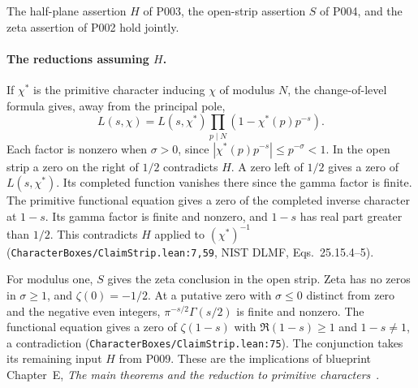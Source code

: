 
\begin{formalstatement}\label{pn:P006}
The half-plane assertion $H$ of P003, the open-strip assertion $S$ of P004, and the zeta assertion of P002 hold jointly.
\end{formalstatement}
\paragraph{The reductions assuming $H$.} If $\chi^*$ is the primitive character inducing $\chi$ of modulus $N$, the change-of-level formula gives, away from the principal pole,
\[
 L(s,\chi)=L(s,\chi^*)\prod_{p\mid N}(1-\chi^*(p)p^{-s}).
\]
Each factor is nonzero when $\sigma>0$, since $|\chi^*(p)p^{-s}|\le p^{-\sigma}<1$. In the open strip a zero on the right of $1/2$ contradicts $H$. A zero left of $1/2$ gives a zero of $L(s,\chi^*)$. Its completed function vanishes there since the gamma factor is finite. The primitive functional equation gives a zero of the completed inverse character at $1-s$. Its gamma factor is finite and nonzero, and $1-s$ has real part greater than $1/2$. This contradicts $H$ applied to $(\chi^*)^{-1}$ (\nolinkurl{CharacterBoxes/ClaimStrip.lean:7,59}, NIST DLMF, Eqs.~25.15.4--5).

For modulus one, $S$ gives the zeta conclusion in the open strip. Zeta has no zeros in $\sigma\ge1$, and $\zeta(0)=-1/2$. At a putative zero with $\sigma\le0$ distinct from zero and the negative even integers, $\pi^{-s/2}\Gamma(s/2)$ is finite and nonzero. The functional equation gives a zero of $\zeta(1-s)$ with $\Re(1-s)\ge1$ and $1-s\ne1$, a contradiction (\nolinkurl{CharacterBoxes/ClaimStrip.lean:75}). The conjunction takes its remaining input $H$ from P009. These are the implications of blueprint Chapter~E, \emph{The main theorems and the reduction to primitive characters}~.
